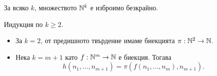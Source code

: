 \begin{prop}
  За всяко $k$, множеството $\mathbb{N}^k$ е изброимо безкрайно.
\end{prop}
\begin{hint}
  Индукция по $k \geq 2$.
  \begin{itemize}
  \item 
    За $k = 2$, от предишното твърдение имаме биекцията $\pi:\mathbb{N}^2 \to \mathbb{N}$.
  \item
    Нека $k = m+1$ като $f:\mathbb{N}^m \to \mathbb{N}$ е биекция.
    Тогава \[h(n_1,\dots,n_{m+1}) = \pi(f(n_1,\dots,n_m),n_{m+1}).\]
  \end{itemize}
\end{hint}




